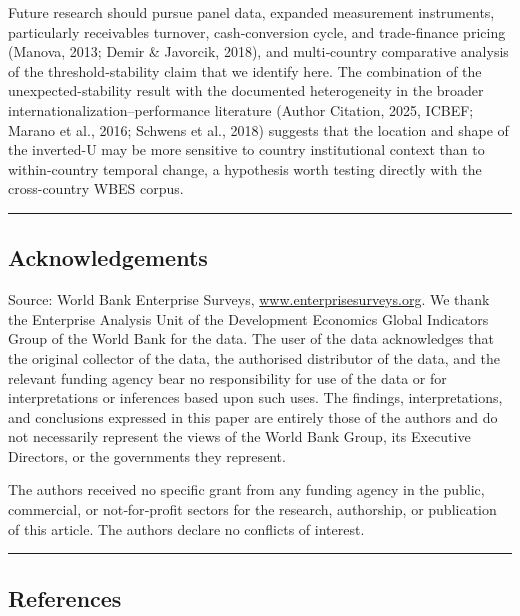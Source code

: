 \documentclass[12pt,a4paper]{article}
\begin{document}
Future research should pursue panel data, expanded measurement
instruments, particularly receivables turnover, cash‑conversion cycle,
and trade‑finance pricing (Manova, 2013; Demir \& Javorcik, 2018), and
multi‑country comparative analysis of the threshold‑stability claim that
we identify here. The combination of the unexpected-stability result
with the documented heterogeneity in the broader
internationalization--performance literature (Author Citation, 2025,
ICBEF; Marano et al., 2016; Schwens et al., 2018) suggests that the
location and shape of the inverted-U may be more sensitive to country
institutional context than to within-country temporal change, a
hypothesis worth testing directly with the cross-country WBES corpus.

\begin{center}\rule{0.5\linewidth}{0.5pt}\end{center}

\hypertarget{acknowledgements}{%
\subsection{Acknowledgements}\label{acknowledgements}}

Source: World Bank Enterprise Surveys,
\href{http://www.enterprisesurveys.org}{www.enterprisesurveys.org}. We
thank the Enterprise Analysis Unit of the Development Economics Global
Indicators Group of the World Bank for the data. The user of the data
acknowledges that the original collector of the data, the authorised
distributor of the data, and the relevant funding agency bear no
responsibility for use of the data or for interpretations or inferences
based upon such uses. The findings, interpretations, and conclusions
expressed in this paper are entirely those of the authors and do not
necessarily represent the views of the World Bank Group, its Executive
Directors, or the governments they represent.

The authors received no specific grant from any funding agency in the
public, commercial, or not‑for‑profit sectors for the research,
authorship, or publication of this article. The authors declare no
conflicts of interest.

\begin{center}\rule{0.5\linewidth}{0.5pt}\end{center}

\hypertarget{references}{%
\subsection{References}\label{references}}
\end{document}
